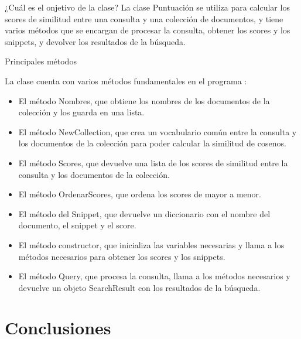 \documentclass[11pt]{beamer}
\begin{document}
	\begin{frame}{¿Cuál es el onjetivo de la clase?}
		\justifying
		La clase Puntuación  se utiliza para calcular los scores de similitud entre una consulta y una colección de documentos, y tiene varios métodos que se encargan de procesar la consulta, obtener los scores y los snippets, y devolver los resultados de la búsqueda.
		
		
	\end{frame}
	\begin{frame}{Principales métodos}
		
		\justifying
		\setlength\parindent{28.35pt}
		La clase cuenta con varios métodos fundamentales en el programa :
		\vspace{0.2cm}
		
		\begin{itemize}
			\item El método Nombres, que obtiene los nombres de los documentos de la colección y los guarda en una lista.
			\item El método NewCollection, que crea un vocabulario común entre la consulta y los documentos de la colección para poder calcular la similitud de cosenos.
			\item	El método Scores, que devuelve una lista de los scores de similitud entre la consulta y los documentos de la colección.
			\item	El método OrdenarScores, que ordena los scores de mayor a menor.
			\item	El método del Snippet, que devuelve un diccionario con el nombre del documento, el snippet y el score.
			\item	El método constructor, que inicializa las variables necesarias y llama a los métodos necesarios para obtener los scores y los snippets.
			\item	El método Query, que procesa la consulta, llama a los métodos necesarios y devuelve un objeto SearchResult con los resultados de la búsqueda.
			
			
		\end{itemize}
		
		
	\end{frame}
	
	
	
	\section{Conclusiones}
	\begin{frame}
		
		\begin{columns}
			\begin{column}{.4\textwidth}
				\tableofcontents[sections={1-2},currentsection]
			\end{column}
			\begin{column}{.4\textwidth}
				\tableofcontents[sections={3-4},currentsection]
			\end{column}
		\end{columns}
		
	\end{frame}
	
\end{document}
